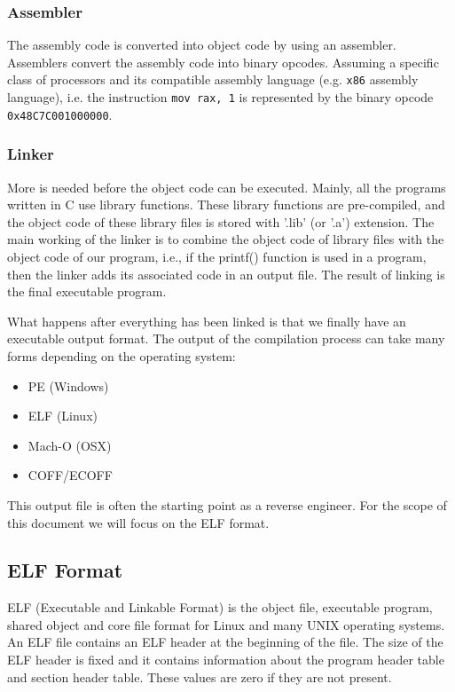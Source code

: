 \documentclass{article}
\begin{document}
\subsubsection{Assembler}

The assembly code is converted into object code by using an assembler. Assemblers convert the assembly code into
binary opcodes. Assuming a specific class of processors and its compatible assembly language (e.g. 
\texttt{x86} assembly language), i.e. the instruction \texttt{mov rax, 1} is represented by the binary opcode
\texttt{0x48C7C001000000}.

\subsubsection{Linker}

More is needed before the object code can be executed. Mainly, all the programs written in C use library functions. 
These library functions are pre-compiled, and the object code of these library files is stored with '.lib' (or '.a') 
extension. The main working of the linker is to combine the object code of library files with the object code of our 
program, i.e., if the printf() function is used in a program, then the linker adds its associated code in an output file. 
The result of linking is the final executable program.

\noindent\linebreak
What happens after everything has been linked is that we finally have an executable output format. The output of the
compilation process can take many forms depending on the operating system:
\begin{itemize}
\item PE (Windows)
\item ELF (Linux)
\item Mach-O (OSX)
\item COFF/ECOFF
\end{itemize}
This output file is often the starting point as a reverse engineer. For the scope of this document we will
focus on the ELF format.

\subsection{ELF Format}

ELF (Executable and Linkable Format) is the object file, executable program, shared object and core file format 
for Linux and many UNIX operating systems. An ELF file contains an ELF header at the beginning of the file. 
The size of the ELF header is fixed and it contains information about the program header table and section header table. 
These values are zero if they are not present. \citep{elf}
\end{document}
